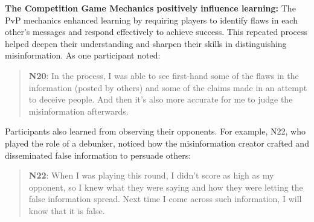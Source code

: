 \textbf{The Competition Game Mechanics positively influence learning:} The PvP mechanics enhanced learning by requiring players to identify flaws in each other’s messages and respond effectively to achieve success. This repeated process helped deepen their understanding and sharpen their skills in distinguishing misinformation. As one participant noted:
\begin{quote}
\textbf{N20}:
In the process, I was able to see first-hand some of the flaws in the information (posted by others) and some of the claims made in an attempt to deceive people. And then it's also more accurate for me to judge the misinformation afterwards.
\end{quote}
Participants also learned from observing their opponents. For example, N22, who played the role of a debunker, noticed how the misinformation creator crafted and disseminated false information to persuade others:
\begin{quote}
    \textbf{N22}:
    When I was playing this round, I didn't score as high as my opponent, so I knew what they were saying and how they were letting the false information spread. Next time I come across such information, I will know that it is false.
\end{quote}

